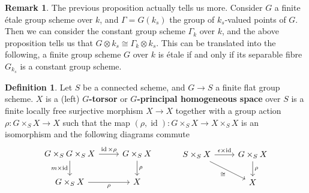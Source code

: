 \documentclass{article}
\theoremstyle{plain}
\theoremstyle{definition}
\newtheorem{definition}[theorem]{Definition}
\newtheorem{remark}{Remark}
\DeclareMathOperator{\id}{id}
\begin{document}
\begin{remark}
\label{constant_group_scheme_etale}
The previous proposition actually tells us more.
Consider $G$ a finite \'etale group scheme over $k$, and $\Gamma = G(k_s)$ the group of $k_s$-valued points of $G$.
Then we can consider the constant group scheme $\Gamma_k$ over $k$, and the above proposition tells us that $G\otimes k_s \cong \Gamma_k \otimes k_s$.
This can be translated into the following, a finite group scheme $G$ over $k$ is \'etale if and only if its separable fibre $G_{k_s}$ is a constant group scheme.
\end{remark}


\begin{definition}
    Let $S$ be a connected scheme, and $G\rightarrow S$ a finite flat group scheme.
    $X$ is a (left) \textbf{$G$-torsor} or \textbf{$G$-principal homogeneous space} over $S$ is a finite locally free surjective morphism $X\rightarrow X$ together with a group action $\rho : G\times_S X\rightarrow X$ such that the map $(\rho,\id):G \times_S X\rightarrow X \times_S X$ is an isomorphism and the following diagrams commute 
    \[
    \begin{tikzcd}
        G\times_S G \times_S X \arrow[r,"\id\times \rho"] \arrow[d, "m\times \id"'] & G\times_S X \arrow[d,"\rho"] \\
        G\times_S X \arrow[r,"\rho"'] &  X
    \end{tikzcd}
    \hspace{1cm}
    \begin{tikzcd}
        S\times_S X \arrow[dr, "\cong"']\arrow[r,"\epsilon \times \id"]  & G\times_S X \arrow[d,"\rho"] \\
        &  X
    \end{tikzcd}
    \]
    
\end{definition}
\end{document}
